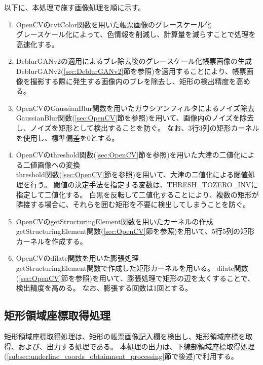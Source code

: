 以下に、本処理で施す画像処理を順に示す。

\begin{enumerate}
    \item OpenCVのcvtColor関数を用いた帳票画像のグレースケール化\\
        グレースケール化によって、色情報を削減し、計算量を減らすことで処理を高速化する。
    \item DeblurGANv2の適用によるブレ除去後のグレースケール化帳票画像の生成\\
        DeblurGANv2(\ref{sec:DeblurGANv2}節を参照)を適用することにより、帳票画像を撮影する際に発生する画像内のブレを除去し、矩形の検出精度を高める。
    \item OpenCVのGaussianBlur関数を用いたガウシアンフィルタによるノイズ除去\\
        GaussianBlur関数(\ref{sec:OpenCV}節を参照)を用いて、画像内のノイズを除去し、ノイズを矩形として検出することを防ぐ。
        なお、3行3列の矩形カーネルを使用し、標準偏差を0とする。
    \item OpenCVのthreshold関数(\ref{sec:OpenCV}節を参照)を用いた大津の二値化による二値画像への変換\\
        threshold関数(\ref{sec:OpenCV}節を参照)を用いて、大津の二値化による閾値処理を行う。
        閾値の決定手法を指定する変数は、THRESH\_TOZERO\_INVに指定して二値化する。
        白黒を反転して二値化することにより、複数の矩形が隣接する場合に、それらを囲む矩形を不要に検出してしまうことを防ぐ。
    \item OpenCVのgetStructuringElement関数を用いたカーネルの作成\\
        getStructuringElement関数(\ref{sec:OpenCV}節を参照)を用いて、5行5列の矩形カーネルを作成する。
    \item OpenCVのdilate関数を用いた膨張処理\\
        getStructuringElement関数で作成した矩形カーネルを用いる。
        dilate関数(\ref{sec:OpenCV}節を参照)を用いて、膨張処理で矩形の辺を太くすることで、検出精度を高める。
        なお、膨張する回数は1回とする。
\end{enumerate}


\subsection{矩形領域座標取得処理}\label{subsec:rect_coords_obtainment_processing}
矩形領域座標取得処理は、矩形の帳票画像記入欄を検出し、矩形領域座標を取得、および、出力する処理である。
本処理の出力は、下線部領域座標取得処理(\ref{subsec:underline_coords_obtainment_processing}節で後述)で利用する。

